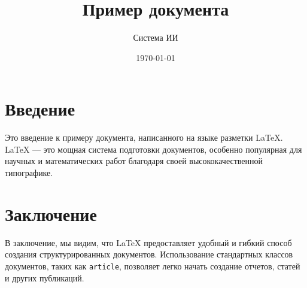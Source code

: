 \documentclass{article}
\title{Пример документа}
\author{Система ИИ}
\date{\today}
\begin{document}
\maketitle

\section{Введение}
Это введение к примеру документа, написанного на языке разметки LaTeX. LaTeX — это мощная система подготовки документов, особенно популярная для научных и математических работ благодаря своей высококачественной типографике.

\section{Заключение}
В заключение, мы видим, что LaTeX предоставляет удобный и гибкий способ создания структурированных документов. Использование стандартных классов документов, таких как \texttt{article}, позволяет легко начать создание отчетов, статей и других публикаций.
\end{document}

